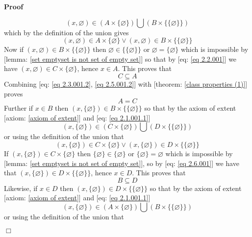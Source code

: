 \documentclass{book}
\newenvironment{proof}{\noindent\textbf{Proof\ }}{\hspace*{\fill}$\Box$\medskip}
\begin{document}
\begin{proof}
\begin{description}
    \[ (x, \varnothing) \in (A \times \{ \varnothing \}) \bigcup (B \times \{
       \{ \varnothing \} \}) \]
    which by the definition of the union gives
    \begin{equation}
      \label{eq 2.2.001} (x, \varnothing) \in A \times \{ \varnothing \} \vee
      (x, \varnothing) \in B \times \{ \{ \varnothing \} \}
    \end{equation}
    Now if $(x, \varnothing) \in B \times \{ \{ \varnothing \} \}$ then
    $\varnothing \in \{ \{ \varnothing \} \}$ or $\varnothing = \{ \varnothing
    \}$ which is impossible by [lemma: \ref{set emptyset is not set of empty
    set}] so that by [eq: \ref{eq 2.2.001}] we have $(x, \varnothing) \in C
    \times \{ \varnothing \}$, hence $x \in A$. This proves that
    \begin{equation}
      \label{eq 2.5.001.2} C \subseteq A
    \end{equation}
    Combining [eq: \ref{eq 2.3.001.2}, \ref{eq 2.5.001.2}] with [theorem:
    \ref{class properties (1)}] proves
    \[ A = C \]
    Further if $x \in B$ then $(x, \{ \varnothing \}) \in B \times \{ \{
    \varnothing \} \}$ so that by the axiom of extent [axiom: \ref{axiom of
    extent}] and [eq: \ref{eq 2.1.001.1}]
    \[ (x, \{ \varnothing \}) \in (C \times \{ \varnothing \}) \bigcup (D
       \times \{ \{ \varnothing \} \}) \]
    or using the definition of the union that
    \begin{equation}
      \label{eq 2.6.001} (x, \{ \varnothing \}) \in C \times \{ \varnothing \}
      \vee (x, \{ \varnothing \}) \in D \times \{ \{ \varnothing \} \}
    \end{equation}
    If $(x, \{ \varnothing \}) \in C \times \{ \varnothing \}$ then $\{
    \varnothing \} \in \{ \varnothing \}$ or $\{ \varnothing \} = \varnothing$
    which is impossible by [lemma: \ref{set emptyset is not set of empty
    set}], so by [eq: \ref{eq 2.6.001}] we have that $(x, \{ \varnothing \})
    \in D \times \{ \{ \varnothing \} \}$, hence $x \in D$. This proves that
    \begin{equation}
      \label{eq 2.7.001} B \subseteq D
    \end{equation}
    Likewise, if $x \in D$ then $(x, \{ \varnothing \}) \in D \times \{ \{
    \varnothing \} \}$ so that by the axiom of extent [axiom: \ref{axiom of
    extent}] and [eq: \ref{eq 2.1.001.1}]
    \[ (x, \{ \varnothing \}) \in (A \times \{ \varnothing \}) \bigcup (B
       \times \{ \{ \varnothing \} \}) \]
    or using the definition of the union that
    \begin{equation}

\end{equation}
\end{description}
\end{proof}
\end{document}
